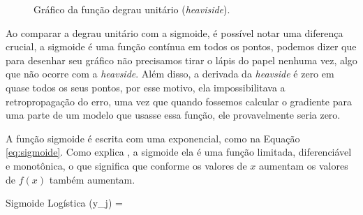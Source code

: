 \begin{figure}[h!]
    \centering
    \caption{Gráfico da função degrau unitário (\textit{heaviside}).}
    \label{fig:degrau-unitario}
\end{figure}

Ao comparar a degrau unitário com a sigmoide, é possível notar uma diferença crucial, a sigmoide é uma função contínua em todos os pontos, podemos dizer que para desenhar seu gráfico não precisamos tirar o lápis do papel nenhuma vez, algo que não ocorre com a \textit{heavside}. Além disso, a derivada da \textit{heavside} é zero em quase todos os seus pontos, por esse motivo, ela impossibilitava a retropropagação do erro, uma vez que quando fossemos calcular o gradiente para uma parte de um modelo que usasse essa função, ele provavelmente seria zero.

A função sigmoide é escrita com uma exponencial, como na Equação \ref{eq:sigmoide}. Como explica \textcite{ActivationFunctionsLederer}, a sigmoide ela é uma função limitada, diferenciável e monotônica, o que significa que conforme os valores de $x$ aumentam os valores de $f(x)$ também aumentam.

\begin{equacaodestaque}{Sigmoide Logística}
    \sigma(y_j) = 
    \label{eq:sigmoide}
\end{equacaodestaque}

